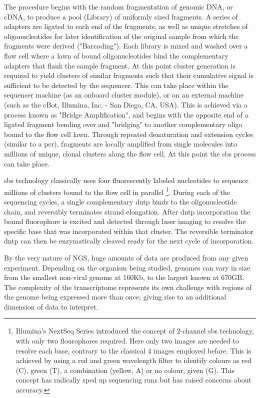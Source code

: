 The procedure begins with the random fragmentation of genomic DNA, or cDNA, to produce a pool (Library) of uniformly sized fragments. A series of adapters are ligated to each end of the fragments, as well as unique stretches of oligonucleotides for later identification of the original sample from which the fragments were derived ("Barcoding"). Each library is mixed and washed over a flow cell where a lawn of bound oligonucleotides bind the complementary adapters that flank the sample fragment.  
At this point cluster generation is required to yield clusters of similar fragments such that their cumulative signal is sufficient to be detected by the sequencer. This can take place within the sequencer machine (as an onboard cluster module), or on an external machine (such as the cBot, Illumina, Inc. - San Diego, CA, USA). This is achieved via a process known as "Bridge Amplification", and begins with the opposite end of a ligated fragment bending over and "bridging" to another complementary oligo bound to the flow cell lawn. Through repeated denaturation and extension cycles (similar to a \acrfull{pcr}), fragments are locally amplified from single molecules into millions of unique, clonal clusters along the flow cell. At this point the \acrshort{sbs} process can take place.

\acrshort{sbs} technology classically uses four fluorescently labeled nucleotides to sequence millions of clusters bound to the flow cell in parallel \footnote[2]{Illumina's NextSeq Series introduced the concept of 2-channel \acrshort{sbs} technology, with only two flourophores required. Here only two images are needed to resolve each base, contrary to the classical 4 images employed before. This is achieved by using a red and green wavelength filter to identify colours as red (C), green (T), a combination (yellow, A) or no colour, given (G). This concept has radically sped up sequencing runs but has raised concerns about accuracy.}. During each of the sequencing cycles, a single complementary \acrfull{dntp} binds to the oligonucleotide chain, and reversibly terminates strand elongation. After \acrshort{dntp} incorporation the bound fluorophore is excited and detected through laser imaging to resolve the specific base that was incorporated within that cluster. The reversible terminator \acrshort{dntp} can then be enzymatically cleaved ready for the next cycle of incorporation. 

By the very nature of NGS, huge amounts of data are produced from any given experiment. Depending on the organism being studied, genomes can vary in size from the smallest non-viral genome at 160Kb, to the largest known at 670GB. The complexity of the transcriptome represents its own challenge with regions of the genome being expressed more than once; giving rise to an additional dimension of data to interpret. 

